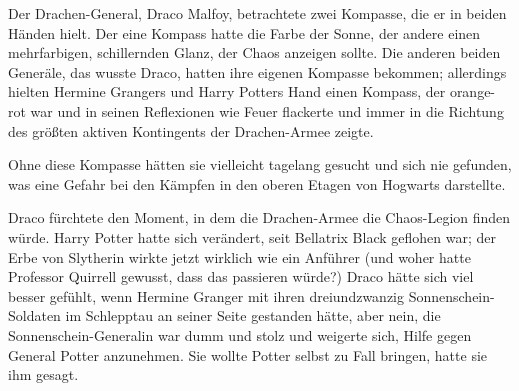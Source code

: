 Der Drachen-General, Draco Malfoy, betrachtete zwei Kompasse, die er in beiden Händen hielt. Der eine Kompass hatte die Farbe der Sonne, der andere einen mehrfarbigen, schillernden Glanz, der Chaos anzeigen sollte. Die anderen beiden Generäle, das wusste Draco, hatten ihre eigenen Kompasse bekommen; allerdings hielten Hermine Grangers und Harry Potters Hand einen Kompass, der orange-rot war und in seinen Reflexionen wie Feuer flackerte und immer in die Richtung des größten aktiven Kontingents der Drachen-Armee zeigte.

Ohne diese Kompasse hätten sie vielleicht tagelang gesucht und sich nie gefunden, was eine Gefahr bei den Kämpfen in den oberen Etagen von Hogwarts darstellte.

Draco fürchtete den Moment, in dem die Drachen-Armee die Chaos-Legion finden würde. Harry Potter hatte sich verändert, seit Bellatrix Black geflohen war; der Erbe von Slytherin wirkte jetzt wirklich wie ein Anführer (und woher hatte Professor Quirrell gewusst, dass das passieren würde?) Draco hätte sich viel besser gefühlt, wenn Hermine Granger mit ihren dreiundzwanzig Sonnenschein-Soldaten im Schlepptau an seiner Seite gestanden hätte, aber nein, die Sonnenschein-Generalin war dumm und stolz und weigerte sich, Hilfe gegen General Potter anzunehmen. Sie wollte Potter selbst zu Fall bringen, hatte sie ihm gesagt.

